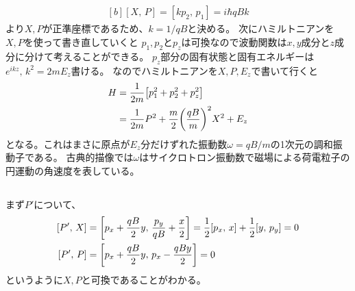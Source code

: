 \documentclass[../../sp_2013.tex]{subfiles}
\begin{document}
\subsection{}
\begin{equation}\begin{aligned}[b]
    [X,\,P] = [kp_2,\,p_1] = i\hbar qBk
\end{aligned}\end{equation}
より\(X,P\)が正準座標であるため、\(k=1/qB\)と決める。
次にハミルトニアンを\(X,P\)を使って書き直していくと
\(p_1,p_2\)と\(p_z\)は可換なので波動関数は\(x,y\)成分と\(z\)成分に分けて考えることができる。
\(p_z\)部分の固有状態と固有エネルギーは\(e^{ikz},\,k^2=2mE_z\)書ける。
なのでハミルトニアンを\(X,P,E_z\)で書いて行くと
\begin{equation}\begin{aligned}[b]
    H &= \frac{1}{2m}\qty[p_1^2 + p_2^2 +p_z^2]\\
    &= \frac{1}{2m}P^2 + \frac{m}{2}\qty(\frac{qB}{m})^2X^2 +E_z
\end{aligned}\end{equation}
となる。これはまさに原点が\(E_z\)分だけずれた振動数\(\omega = qB/m\)の1次元の調和振動子である。
古典的描像では\(\omega\)はサイクロトロン振動数で磁場による荷電粒子の円運動の角速度を表している。

\subsection{}
まず\(P'\)について、
\begin{equation}\begin{aligned}[b]
    [P',\,X] &= \qty[p_x+\frac{qB}{2}y,\,\frac{p_y}{qB}+\frac{x}{2}]
    = \frac{1}{2}[p_x,\,x]+\frac{1}{2}[y,\,p_y] =0\\
    [P',\,P] &= \qty[p_x+\frac{qB}{2}y,\,p_x-\frac{qBy}{2}] = 0
\end{aligned}\end{equation}
というように\(X,P\)と可換であることがわかる。
\end{document}
